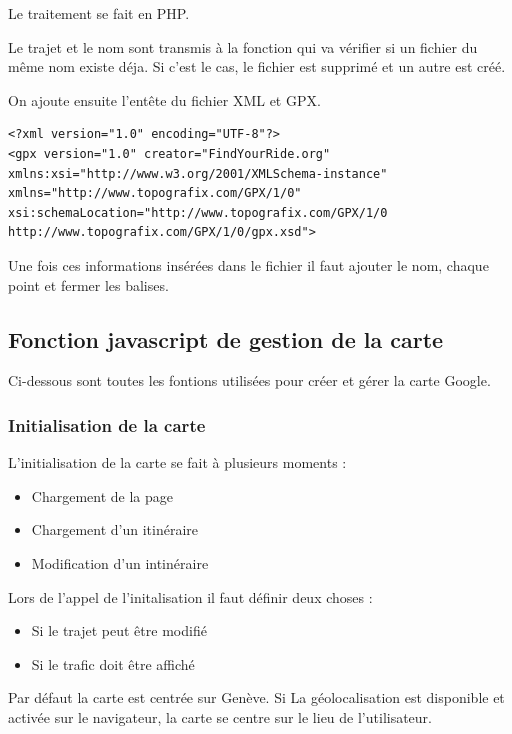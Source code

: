 \documentclass[a4paper]{article}
\newcommand{\diag}[1]{}
\begin{document}
Le traitement se fait en PHP.

Le trajet et le nom sont transmis à la fonction qui va  vérifier si un fichier du même nom existe déja. Si c'est le cas, le fichier est supprimé et un autre est créé. 

On ajoute ensuite l'entête du fichier XML et GPX.

\lstset{language=XML}
\begin{lstlisting}[frame=single] 
<?xml version="1.0" encoding="UTF-8"?>
<gpx version="1.0" creator="FindYourRide.org" xmlns:xsi="http://www.w3.org/2001/XMLSchema-instance" xmlns="http://www.topografix.com/GPX/1/0" xsi:schemaLocation="http://www.topografix.com/GPX/1/0 http://www.topografix.com/GPX/1/0/gpx.xsd">
\end{lstlisting}

Une fois ces informations insérées dans le fichier il faut ajouter le nom, chaque point et fermer les balises.

\begin{center}
	\diag{PathToGpx}
\end{center}


\subsection{Fonction javascript de gestion de la carte}
Ci-dessous sont toutes les fontions utilisées pour créer et gérer la carte Google.

\subsubsection{Initialisation de la carte}
L'initialisation de la carte se fait à plusieurs moments : 
\begin{itemize}
	\item Chargement de la page
	\item Chargement d'un itinéraire
	\item Modification d'un intinéraire
\end{itemize}

Lors de l'appel de l'initalisation il faut définir deux choses :
\begin{itemize}
	\item Si le trajet peut être modifié
	\item Si le trafic doit être affiché
\end{itemize}

Par défaut la carte est centrée sur Genève. Si La géolocalisation est disponible et activée sur le navigateur, la carte se centre sur le lieu de l'utilisateur.
\end{document}
